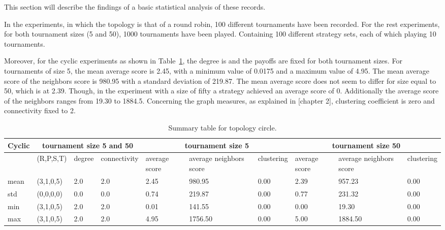 This section will describe the findings of a basic statistical analysis of these
records.

In the experiments, in which the topology is that of a round robin,
100 different tournaments have been recorded.
For the rest experiments, for both tournament sizes (5 and 50),
1000 tournaments have been played. Containing 100 different strategy sets, each of
which playing 10 tournaments.

Moreover, for the cyclic experiments as shown in Table~\ref{sum-cicle}, the degree is
and the payoffs are fixed for both tournament sizes. For tournaments of size 5,
the mean average score is 2.45, with a minimum value of 0.0175 and a maximum
value of 4.95. The mean average score of the neighbors score is 980.95 with a
standard deviation of 219.87.
The mean average score does not seem to differ for size equal to 50, which is at
2.39. Though, in the experiment with a size of fifty a strategy
achieved an average score of 0. Additionally the average score of the neighbors ranges
from 19.30 to 1884.5. Concerning the graph measures, as explained in [chapter 2],
clustering coefficient is zero and connectivity fixed to 2.

\begin{table}[!hbtp]
\centering
\begin{adjustbox}{width=1\textwidth}
\small
\begin{tabular}{@{}|l|l|l|l|l|l|l|l|l|l|@{}}
\toprule
Cyclic & \multicolumn{3}{c|}{tournament size 5 and 50} & \multicolumn{3}{c|}{tournament size 5} & \multicolumn{3}{c|}{tournament size 50}                             \\\midrule

       & (R,P,S,T) & degree & connectivity & average score & average neighbors score & clustering & average score & average neighbors score & clustering \\\midrule
mean   & (3,1,0,5) & 2.0    & 2.0          & 2.45      & 980.95            & 0.00       & 2.39     & 957.23             & 0.00       \\\midrule
std    & (0,0,0,0) & 0.0    & 0.0          & 0.74      & 219.87             & 0.00       & 0.77    & 231.32              & 0.00       \\\midrule
min    & (3,1,0,5) & 2.0    & 2.0          & 0.01      & 141.55             & 0.00       & 0.00    & 19.30              & 0.00       \\\midrule
max    & (3,1,0,5) & 2.0    & 2.0          & 4.95     & 1756.50             & 0.00       & 5.00    & 1884.50             & 0.00       \\ \bottomrule
\end{tabular}
\end{adjustbox}
\caption{Summary table for topology circle.}
\label{sum-cicle}
\end{table}

